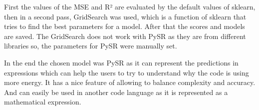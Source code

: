 First the values of the MSE and R² are evaluated by the default values of sklearn, then in a second pass, GridSearch was used, which is a function of sklearn that tries to find the best parameters for a model. After that the scores and models are saved. The GridSearch does not work with PySR as they are from different libraries so, the parameters for PySR were manually set.

In the end the chosen model was PySR as it can represent the predictions in expressions which can help the users to try to understand why the code is using more energy. It has a nice feature of allowing to balance complexity and accuracy. And can easily be used in another code language as it is represented as a mathematical expression.

